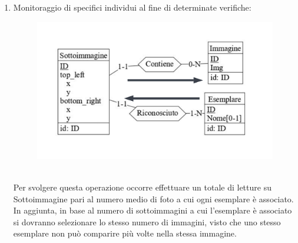 \documentclass[a4paper,final,12pt]{report}
\begin{document}
\begin{enumerate}
\item Monitoraggio di specifici individui al fine di determinate verifiche:
\begin{figure}[hbtp]
\centering
\includegraphics[scale=1.1]{img_concettuale/individuo.png}
\end{figure}
\\Per svolgere questa operazione occorre effettuare un totale di letture su Sottoimmagine pari al numero medio di foto a cui ogni esemplare è associato. In aggiunta, in base al numero di sottoimmagini a cui l'esemplare è associato si dovranno selezionare lo stesso numero di immagini, visto che uno stesso esemplare non può comparire più volte nella stessa immagine.
\begin{table}[hbtp]
\centering
{}
\end{table}


\end{enumerate}
\end{document}
